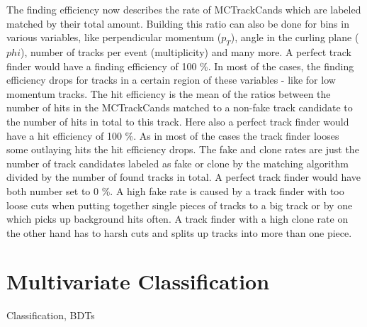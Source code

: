 The finding efficiency now describes the rate of MCTrackCands which are labeled matched by their total amount. Building this ratio can also be done for bins in various variables, like perpendicular momentum ($p_T$), angle in the curling plane ($phi$), number of tracks per event (multiplicity) and many more. A perfect track finder would have a finding efficiency of 100 \%. In most of the cases, the finding efficiency drops for tracks in a certain region of these variables - like for low momentum tracks.
The hit efficiency is the mean of the ratios between the number of hits in the MCTrackCands matched to a non-fake track candidate to the number of hits in total to this track. Here also a perfect track finder would have a hit efficiency of 100 \%. As in most of the cases the track finder looses some outlaying hits the hit efficiency drops.
The fake and clone rates are just the number of track candidates labeled as fake or clone by the matching algorithm divided by the number of found tracks in total. A perfect track finder would have both number set to 0 \%. A high fake rate is caused by a track finder with too loose cuts when putting together single pieces of tracks to a big track or by one which picks up background hits often. A track finder with a high clone rate on the other hand has to harsh cuts and splits up tracks into more than one piece.


\section{Multivariate Classification}
Classification, BDTs
